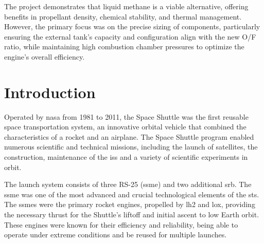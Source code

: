    The project demonstrates that liquid methane is a viable alternative, offering benefits in propellant density, chemical stability, and thermal management. However, the primary focus was on the precise sizing of components, particularly ensuring the external tank's capacity and configuration align with the new O/F ratio, while maintaining high combustion chamber pressures to optimize the engine's overall efficiency.
   \newpage
    \tableofcontents
    \newpage
    \printglossary[type=\acronymtype]
    \newpage
    \section{Introduction} \label{intro}
	Operated by \acrshort{nasa} from 1981 to 2011, the Space Shuttle was the first reusable space transportation system, an innovative orbital vehicle that combined the characteristics of a rocket and an airplane.
The Space Shuttle program enabled numerous scientific and technical missions, including the launch of satellites, the construction, maintenance of the \acrfull{iss} and a variety of scientific experiments in orbit.

The launch system consists of three RS-25 (\acrshort{ssme}) and two additional \acrfull{srb}. The \acrfull{ssme} was one of the most advanced and crucial technological elements of the \acrshort{sts}. The \acrshort{ssme}s were the primary rocket engines, propelled by \acrfull{lh2} and \acrfull{lox}, providing the necessary thrust for the Shuttle's liftoff and initial ascent to low Earth orbit. These engines were known for their efficiency and reliability, being able to operate under extreme conditions and be reused for multiple launches.


